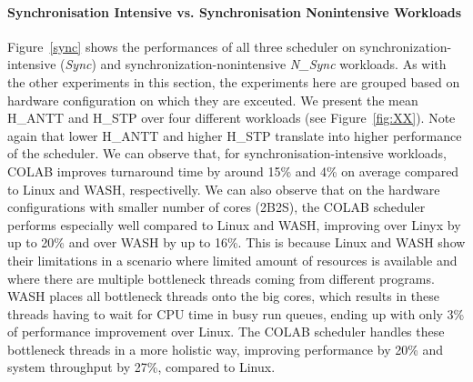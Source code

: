 \paragraph{Synchronisation Intensive vs. Synchronisation Nonintensive Workloads} Figure~\ref{sync} shows the performances of all three scheduler on synchronization-intensive (\emph{Sync}) and synchronization-nonintensive \emph{N\_Sync} workloads. As with the other experiments in this section, the experiments here are grouped based on hardware configuration on which they are exceuted. We present the mean H\_ANTT and H\_STP over four different workloads (see Figure~\ref{fig:XX}). Note again that lower H\_ANTT and higher H\_STP translate into higher performance of the scheduler. We can observe that, for synchronisation-intensive workloads, COLAB improves turnaround time by around 15\% and 4\% on average compared to Linux and WASH, respectivelly. We can also observe that on the hardware configurations with smaller number of cores (2B2S), the COLAB scheduler performs especially well compared to Linux and WASH, improving over Linyx by up to 20\% and over WASH by up to 16\%. This is because Linux and WASH show their limitations in a scenario where limited amount of resources is available and where there are multiple bottleneck threads coming from different programs. WASH places all bottleneck threads onto the big cores, which results in these threads having to wait for CPU time in busy run queues, ending up with only 3\% of performance improvement over Linux. The COLAB scheduler handles these bottleneck threads in a more holistic way, improving performance by 20\% and system throughput by 27\%, compared to Linux.


